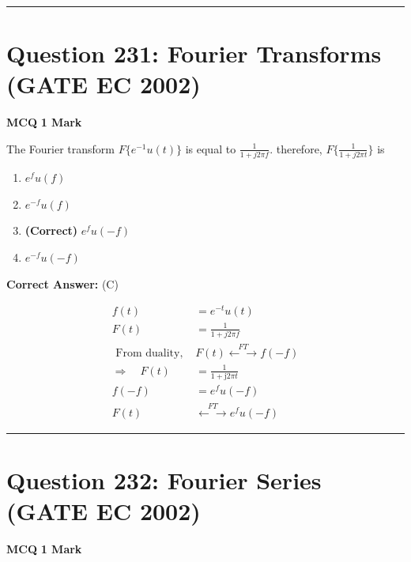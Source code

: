 \documentclass[11pt,a4paper]{article}
\begin{document}
\vspace{1.5em}
\hrule
\vspace{1.5em}

\section*{Question 231: Fourier Transforms (GATE EC 2002)}
\noindent \textbf{\color{primary}MCQ} \hfill \textbf{\color{secondary}1 Mark}


\noindent The Fourier transform $F\{e^{-1}u(t)\}$ is equal to $\frac{1}{1+j2\pi f}$. therefore, $F\{\frac{1}{1+j2\pi t}\}$ is


\begin{enumerate}[label=(\Alph*)]
    \item $e^{f}u(f)$
    \item $e^{-f}u(f)$
    \item \textbf{(Correct)} $e^{f}u(-f)$
    \item $e^{-f}u(-f)$
\end{enumerate}

\noindent \textbf{Correct Answer:} (C)

\begin{tcolorbox}[solbox, title=Detailed Solution -- Question 231]
\[
\begin{aligned} f(t) &=e^{-t} u(t) \\ F(t) &=\frac{1}{1+j 2 \pi f}\\ \text { From duality, } &F(t) \stackrel{F T}{\leftarrow\longrightarrow}{f(-f)}\\ \Rightarrow \quad F(t)&=\frac{1}{1+\mathrm{j} 2 \pi t} \\ f(-f)&=e^{f} u(-f) \\ F(t) &\stackrel{F T}{\leftarrow\longrightarrow} e^{f} u(-f) \end{aligned}
\]
\end{tcolorbox}

\vspace{1.5em}
\hrule
\vspace{1.5em}

\section*{Question 232: Fourier Series (GATE EC 2002)}
\noindent \textbf{\color{primary}MCQ} \hfill \textbf{\color{secondary}1 Mark}
\end{document}
